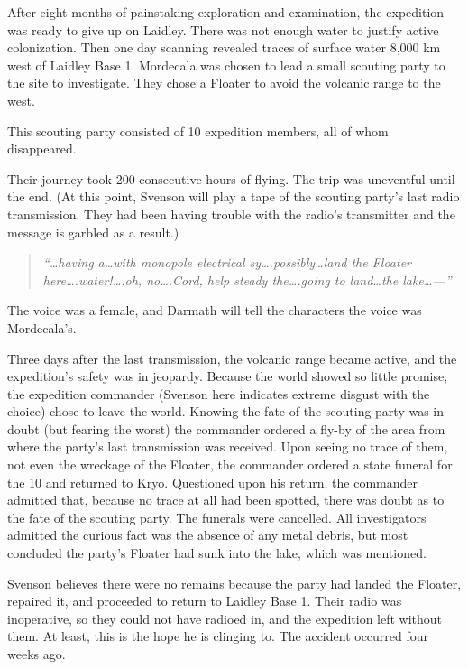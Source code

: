 After eight months of painstaking exploration and examination, the
expedition was ready to give up on Laidley. There was not enough water
to justify active colonization.  Then one day scanning revealed traces
of surface water 8,000 km west of Laidley Base 1.  Mordecala was
chosen to lead a small scouting party to the site to investigate. They
chose a Floater to avoid the volcanic range to the west.

This scouting party consisted of 10 expedition members, all of whom
disappeared.

Their journey took 200 consecutive hours of flying. The trip was
uneventful until the end. (At this point, Svenson will play a tape of
the scouting party's last radio transmission. They had been having
trouble with the radio's transmitter and the message is garbled as a
result.)

\begin{quote}
  \emph{``\ldots having a\ldots with monopole electrical
    sy\ldots.possibly\ldots land the Floater
    here\ldots.water!\ldots.oh, no\ldots.Cord, help steady
    the\ldots.going to land\ldots the lake\ldots---''}
\end{quote}

The voice was a female, and Darmath will tell the characters the voice
was Mordecala's.

Three days after the last transmission, the volcanic range became
active, and the expedition's safety was in jeopardy. Because the world
showed so little promise, the expedition commander (Svenson here
indicates extreme disgust with the choice) chose to leave the world.
Knowing the fate of the scouting party was in doubt (but fearing the
worst) the commander ordered a fly-by of the area from where the
party's last transmission was received. Upon seeing no trace of them,
not even the wreckage of the Floater, the commander ordered a state
funeral for the 10 and returned to Kryo. Questioned upon his return,
the commander admitted that, because no trace at all had been spotted,
there was doubt as to the fate of the scouting party. The funerals
were cancelled. All investigators admitted the curious fact was the
absence of any metal debris, but most concluded the party's Floater
had sunk into the lake, which was mentioned.

Svenson believes there were no remains because the party had landed
the Floater, repaired it, and proceeded to return to Laidley Base 1.
Their radio was inoperative, so they could not have radioed in, and
the expedition left without them. At least, this is the hope he is
clinging to. The accident occurred four weeks ago.

